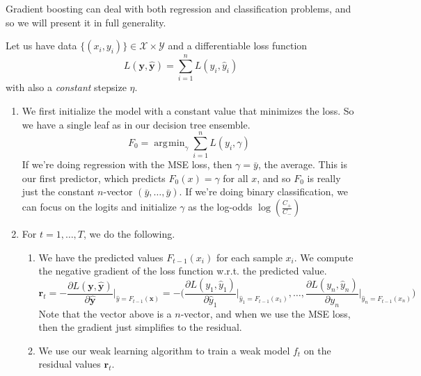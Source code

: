 \documentclass{article}
\DeclareMathOperator*{\argmin}{\arg\!\min}
\begin{document}
    Gradient boosting can deal with both regression and classification problems, and so we will present it in full generality. 

    \begin{definition}
      Let us have data $\{(x_i, y_i)\} \in \mathcal{X} \times \mathcal{Y}$ and a differentiable loss function 
      \begin{equation}
        L(\mathbf{y}, \hat{\mathbf{y}}) = \sum_{i=1}^n L(y_i, \hat{y}_i)
      \end{equation}
      with also a \textit{constant} stepsize $\eta$. 

      \begin{enumerate}
        \item We first initialize the model with a constant value that minimizes the loss. So we have a single leaf as in our decision tree ensemble. 
          \begin{equation}
            F_0 = \argmin_\gamma \sum_{i=1}^n L(y_i, \gamma)
          \end{equation}
          If we're doing regression with the MSE loss, then $\gamma = \bar{y}$, the average. This is our first predictor, which predicts $F_0 (x) = \gamma$ for all $x$, and so $F_0$ is really just the constant $n$-vector $(\bar{y}, \ldots, \bar{y})$. If we're doing binary classification, we can focus on the logits and initialize $\gamma$ as the log-odds $\log(\frac{C_+}{C_{-}})$

        \item For $t = 1, \ldots, T$, we do the following. 
          \begin{enumerate}
            \item We have the predicted values $F_{t-1}(x_i)$ for each sample $x_i$. We compute the negative gradient of the loss function w.r.t. the predicted value.
              \begin{equation}
                \mathbf{r}_t = - \frac{\partial L(\mathbf{y}, \hat{\mathbf{y}})}{\partial \hat{\mathbf{y}}} \bigg|_{\hat{y} = F_{t-1} (\mathbf{x})} = - \bigg( \frac{\partial L(y_1, \hat{y}_1)}{\partial \hat{y}_1} \bigg|_{\hat{y}_1 = F_{t-1} (x_1)}, \ldots, \frac{\partial L(y_n, \hat{y}_n)}{\partial y_n} \bigg|_{\hat{y}_n = F_{t-1}(x_n)} \bigg)
              \end{equation}
              Note that the vector above is a $n$-vector, and when we use the MSE loss, then the gradient just simplifies to the residual.  

            \item We use our weak learning algorithm to train a weak model $f_t$ on the residual values $\mathbf{r}_t$. 


\end{enumerate}
\end{enumerate}
\end{definition}
\end{document}
